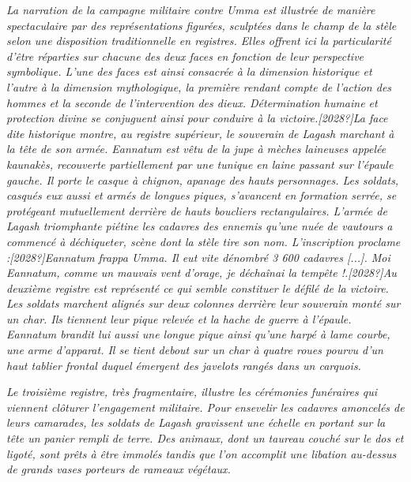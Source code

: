 \documentclass[a4paper,10pt]{article}
\begin{document}
\begin{itemize}
\textit{La narration de la campagne militaire contre Umma est illustrée
de manière spectaculaire par des représentations figurées, sculptées
dans le champ de la stèle selon une disposition traditionnelle en
registres. Elles offrent ici la particularité d'être
réparties sur chacune des deux faces en fonction de leur perspective
symbolique. L'une des faces est ainsi consacrée à la
dimension {\textquotedbl}historique{\textquotedbl} et
l'autre à la} \textit{dimension
{\textquotedbl}mythologique{\textquotedbl}, la première rendant compte
de l'action des hommes et la seconde de
l'intervention des dieux. Détermination humaine et
protection divine se conjuguent ainsi pour conduire à la
victoire.[2028?]La face dite {\textquotedbl}historique{\textquotedbl}
montre, au registre supérieur, le souverain de Lagash marchant à la
tête de son armée. Eannatum est vêtu de la jupe à mèches laineuses
appelée kaunakès, recouverte partiellement par une tunique en laine
passant sur l'épaule gauche. Il porte le casque à
chignon, apanage des hauts personnages. Les soldats, casqués eux aussi
et armés de longues piques, s'avancent en formation
serrée, se protégeant mutuellement derrière de hauts boucliers
rectangulaires. L'armée de Lagash triomphante piétine
les cadavres des ennemis qu'une nuée de vautours a
commencé à déchiqueter, scène dont la stèle tire son nom.
L'inscription proclame
:[2028?]{\textquotedbl}}\textit{Eannatum }\textit{frappa Umma. Il eut
vite dénombré 3 600 cadavres [...]. Moi Eannatum, comme un mauvais vent
d'orage, je déchaînai la tempête
!}\textit{{\textquotedbl}.[2028?]Au deuxième registre est représenté ce
qui semble constituer le défilé de la victoire. Les soldats marchent
alignés sur deux colonnes derrière leur souverain monté sur un char.
Ils tiennent leur pique relevée et la hache de guerre à
l'épaule. Eannatum brandit lui aussi une longue pique
ainsi qu'une harpé à lame courbe, une arme
d'apparat. Il se tient debout sur un char à quatre
roues pourvu d'un haut tablier frontal duquel émergent
des javelots rangés dans un carquois.}

\textit{Le troisième registre, très fragmentaire, illustre les
cérémonies funéraires qui viennent clôturer
l'engagement militaire. Pour ensevelir les cadavres
amoncelés de leurs camarades, les soldats de Lagash gravissent une
échelle en portant sur la tête un panier rempli de terre. Des animaux,
dont un taureau couché sur le dos et ligoté, sont prêts à être immolés
tandis que l'on accomplit une libation au-dessus de
grands vases porteurs de rameaux végétaux.}


\end{itemize}
\end{document}

